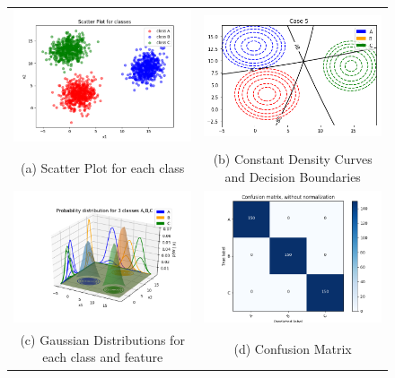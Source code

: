 \begin{figure}[H]
	\hspace*{-2cm}\begin{tabular}{cc}
		\includegraphics[width=70mm]{./dataset1/scatter.png} &   \includegraphics[width=70mm]{./dataset1/contour.png} \\
		(a) Scatter Plot for each class & (b) Constant Density Curves and Decision Boundaries\\[4pt]
		
		\includegraphics[width=70mm]{./dataset1/PDF.png} &   \includegraphics[width=70mm]{./dataset1/confusionMatrix.png} \\
		(c) Gaussian Distributions for each class and feature & (d) Confusion Matrix \\[4pt]
		

\end{tabular}
\end{figure}
